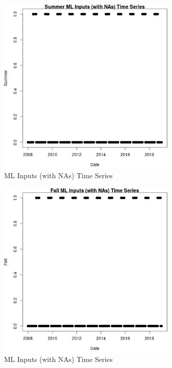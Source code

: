 \begin{figure} 
\centering  
\includegraphics[width=0.77\textwidth]{Code_Outputs/Report_ML_input_PM25_Step4_part_e_de_duplicated_aves_compiled_2019-05-21wNAs_SummervDate.jpg} 
\caption{\label{fig:Report_ML_input_PM25_Step4_part_e_de_duplicated_aves_compiled_2019-05-21wNAsSummervDate}ML Inputs (with NAs) Time Series} 
\end{figure} 
 

\begin{figure} 
\centering  
\includegraphics[width=0.77\textwidth]{Code_Outputs/Report_ML_input_PM25_Step4_part_e_de_duplicated_aves_compiled_2019-05-21wNAs_FallvDate.jpg} 
\caption{\label{fig:Report_ML_input_PM25_Step4_part_e_de_duplicated_aves_compiled_2019-05-21wNAsFallvDate}ML Inputs (with NAs) Time Series} 
\end{figure} 
 
